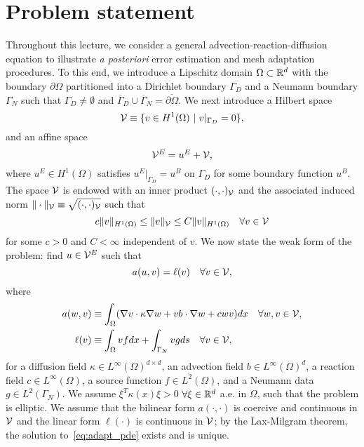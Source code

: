 \section{Problem statement}
Throughout this lecture, we consider a general advection-reaction-diffusion equation to illustrate \textit{a posteriori} error estimation and mesh adaptation procedures. To this end, we introduce a Lipschitz domain $\Omega \subset \mathbb{R}^d$ with the boundary $\partial \Omega$ partitioned into a Dirichlet boundary $\Gamma_D$ and a Neumann boundary $\Gamma_N$ such that $\Gamma_D \neq \emptyset$ and $\overline{\Gamma}_D \cup \overline{\Gamma}_N = \overline {\partial \Omega}$. We next introduce a Hilbert space
\begin{equation*}
  \mathcal{V} \equiv \{ v \in H^1(\Omega) \ | \ v|_{\Gamma_D} = 0 \},
\end{equation*}
and an affine space
\begin{equation*}
  \mathcal{V}^E = u^E + \mathcal{V},
\end{equation*}
where $u^E \in H^1(\Omega)$ satisfies $u^E|_{\Gamma_D} = u^B$ on $\Gamma_D$ for some boundary function $u^B$. The space $\mathcal{V}$ is endowed with an inner product $(\cdot,\cdot)_{\mathcal{V}}$ and the associated induced norm $\| \cdot \|_{\mathcal{V}} \equiv \sqrt{(\cdot,\cdot)_{\mathcal{V}}}$ such that
\begin{equation*}
  c \| v \|_{H^1(\Omega)} \leq \| v \|_{\mathcal{V}} \leq C \| v \|_{H^1(\Omega)} \quad \forall v \in \mathcal{V}
\end{equation*}
for some $c > 0$ and $C < \infty$ independent of $v$. We now state the weak form of the problem: find $u \in \mathcal{V}^E$ such that
\begin{equation}
  a(u,v) = \ell(v) \quad \forall v \in \mathcal{V},
  \label{eq:adapt_pde}
\end{equation}
where
\begin{align*}
  a(w,v) &\equiv \int_\Omega ( \nabla v \cdot \kappa \nabla w + v b \cdot \nabla w + c w v) dx \quad \forall w, v \in \mathcal{V},
  \\
  \ell(v) &\equiv \int_\Omega vf dx + \int_{\Gamma_N} vg ds \quad \forall v \in \mathcal{V},
\end{align*}
for a diffusion field $\kappa \in L^{\infty}(\Omega)^{d \times d}$, an advection field $b \in L^\infty(\Omega)^d$, a reaction field $c \in L^\infty(\Omega)$, a source function $f \in L^{2}(\Omega)$, and a Neumann data $g \in L^2(\Gamma_N)$. We assume $\xi^T \kappa(x) \xi > 0$ $\forall \xi \in \mathbb{R}^d$ a.e. in $\Omega$, such that the problem is elliptic.  We assume that the bilinear form $a(\cdot,\cdot)$ is coercive and continuous in $\mathcal{V}$ and the linear form $\ell(\cdot)$ is continuous in $\mathcal{V}$; by the Lax-Milgram theorem, the solution to~\eqref{eq:adapt_pde} exists and is unique.

